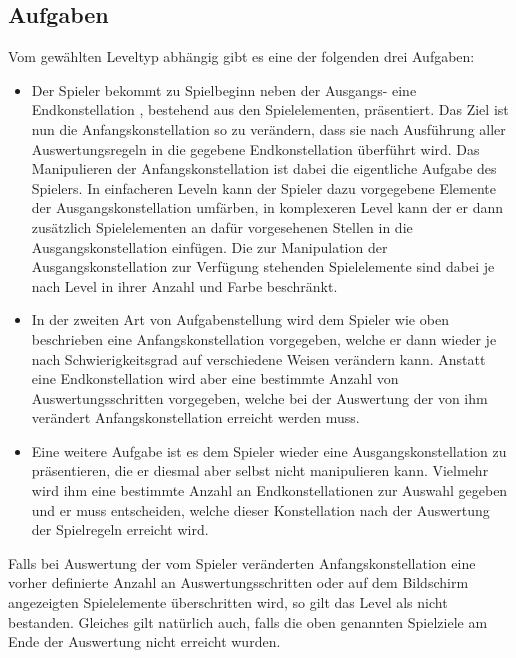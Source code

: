 \subsection{Aufgaben}
Vom gewählten Leveltyp abhängig gibt es eine der folgenden drei Aufgaben:
	\begin{itemize}
		\item Der Spieler bekommt zu Spielbeginn neben der Ausgangs- eine Endkonstellation , bestehend aus den Spielelementen, präsentiert.
		Das Ziel ist nun die Anfangskonstellation so zu verändern, dass sie nach Ausführung aller Auswertungsregeln in die gegebene Endkonstellation überführt wird.
		Das Manipulieren der Anfangskonstellation ist dabei die eigentliche Aufgabe des Spielers.
		In einfacheren Leveln kann der Spieler dazu vorgegebene Elemente der Ausgangskonstellation umfärben, in komplexeren Level kann der er dann zusätzlich Spielelementen an dafür vorgesehenen Stellen in die Ausgangskonstellation einfügen. Die zur Manipulation der Ausgangskonstellation zur Verfügung stehenden Spielelemente sind dabei je nach Level in ihrer Anzahl und Farbe beschränkt.

		\item In der zweiten Art von Aufgabenstellung wird dem Spieler wie oben beschrieben eine Anfangskonstellation vorgegeben, welche er dann wieder je nach Schwierigkeitsgrad auf verschiedene Weisen verändern kann. Anstatt eine Endkonstellation wird aber eine bestimmte Anzahl von Auswertungsschritten vorgegeben, welche bei der Auswertung der von ihm verändert Anfangskonstellation erreicht werden muss.

		\item Eine weitere Aufgabe ist es dem Spieler wieder eine Ausgangskonstellation zu präsentieren, die er diesmal aber selbst nicht manipulieren kann. Vielmehr wird ihm eine bestimmte Anzahl an Endkonstellationen zur Auswahl gegeben und er muss entscheiden, welche dieser Konstellation nach der Auswertung der Spielregeln erreicht wird.

	\end{itemize}

	Falls bei Auswertung der vom Spieler veränderten Anfangskonstellation eine vorher definierte Anzahl an Auswertungsschritten oder auf dem Bildschirm angezeigten Spielelemente überschritten wird, so gilt das Level als nicht bestanden. Gleiches gilt natürlich auch, falls die oben genannten Spielziele am Ende der Auswertung nicht erreicht wurden. \\

